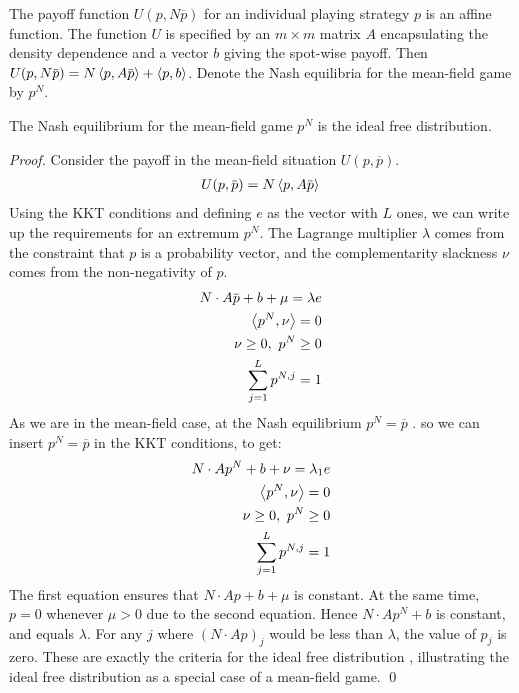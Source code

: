The payoff function $U(p,N\overbar{p})$ for an individual playing strategy $p$ is an affine function. The function $U$ is specified by an $m\times m$ matrix $A$ encapsulating the density dependence and a vector $b$ giving the spot-wise payoff. Then $U(p,N\overbar{p}) = N\ip{p}{A \overbar{p}} + \ip{p}{b}$. Denote the Nash equilibria for the mean-field game by $p^N$.
\begin{proposition}
  \label{prop:doubleup}
  The Nash equilibrium for the mean-field game $p^{N}$ is the ideal free distribution.
\end{proposition}
\begin{proof}
Consider the payoff in the mean-field situation $U(p,\overbar{p})$.
\begin{align}
  U(p, \overbar{p}) = N \ip{p}{A\overbar{p}}
\end{align}
Using the KKT conditions and defining $e$ as the vector with $L$ ones, we can write up the requirements for an extremum $p^{N}$. The Lagrange multiplier $\lambda$ comes from the constraint that $p$ is a probability vector, and the complementarity slackness $\nu$ comes from the non-negativity of $p$.
\begin{equation}
  \begin{split}
    N \cdot A\overbar{p} + b + \mu = \lambda e \\
    \ip{p^{N}}{\nu} = 0 \\
    \nu \geq 0,~p^{N} \geq 0 \\
    \sum_{j=1}^L p^{N,j} = 1
  \end{split}
\end{equation}
As we are in the mean-field case, at the Nash equilibrium $p^N = \overbar{p}$ .
so we can insert $p^N=\overbar{p}$ in the KKT conditions, to get:
\begin{equation}
  \begin{split}
    N \cdot Ap^{N} + b + \nu =  \lambda_1 e \\
    \left \langle p^N,\nu \right \rangle = 0 \\
    \nu \geq 0,~p^{N} \geq 0 \\
    \sum_{j=1}^L p^{N,j} = 1
  \end{split}
\end{equation}
The first equation ensures that $N\cdot Ap + b + \mu$ is constant. At the same time, $p=0$ whenever $\mu > 0$ due to the second equation. Hence $N\cdot Ap^{N} + b$ is constant, and equals $\lambda$. For any $j$ where $(N\cdot Ap)_j$ would be less than $\lambda$, the value of $p_j$ is zero.
These are exactly the criteria for the ideal free distribution \citep{fretwell1969territorial}, illustrating the ideal free distribution as a special case of a mean-field game.
\qed
\end{proof}
